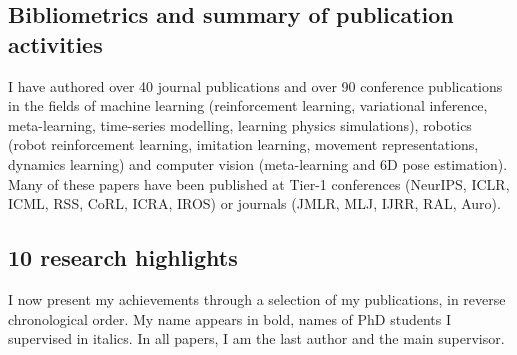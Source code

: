 \subsection{Bibliometrics and summary of publication activities}
I have authored over 40 journal publications and over 90 conference publications in the fields of machine learning (reinforcement learning, variational inference, meta-learning, time-series modelling, learning physics simulations), robotics (robot reinforcement learning, imitation learning, movement representations, dynamics learning) and computer vision (meta-learning and 6D pose estimation). Many of these papers have been published at Tier-1 conferences (NeurIPS, ICLR, ICML, RSS, CoRL, ICRA, IROS) or journals (JMLR, MLJ, IJRR, RAL, Auro). 

\subsection{10 research highlights}

I now present my achievements through a selection of my publications, in
reverse chronological order. My name appears in bold, names of PhD
students I supervised in italics. In all papers, I am the last author and the main supervisor.

